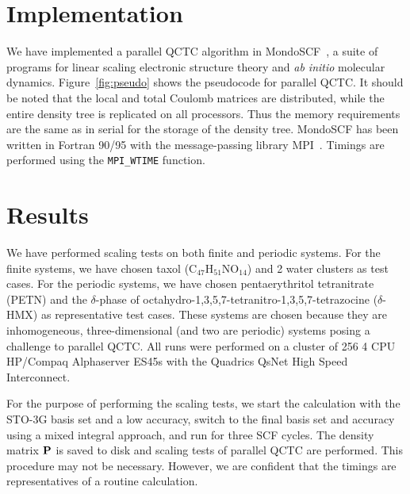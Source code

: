 \commentoutA{\documentclass[prl,aps,twocolumn,twocolumngrid,superbib]{revtex4}}
\begin{document}
\section{Implementation}
\label{sec:implementation}
We have implemented a parallel QCTC algorithm in {\sc
MondoSCF}~\cite{MondoSCF}, a suite of programs for linear scaling
electronic structure theory and {\it ab initio}\/ molecular dynamics.
Figure~\ref{fig:pseudo} shows the pseudocode for parallel QCTC.
It should be noted that the local and total Coulomb matrices are distributed,
while the entire density tree is replicated on all processors.
Thus the memory requirements are the same as in serial for the storage of
the density tree.
{\sc MondoSCF} has been written in Fortran 90/95 with the
message-passing library MPI~\cite{mpi}.  Timings are performed using
the {\tt MPI\_WTIME} function.

\section{Results}
\label{results}
We have performed scaling tests on both finite and periodic
systems. For the finite systems, we have chosen taxol
(C$_{47}$H$_{51}$NO$_{14}$) and 2 water clusters as test cases. For
the periodic systems, we have chosen pentaerythritol tetranitrate
(PETN)\cite{CGan04A} and the $\delta$-phase of
octahydro-1,3,5,7-tetranitro-1,3,5,7-tetrazocine
($\delta$-HMX)\cite{JPLewis00} as representative test cases. These
systems are chosen because they are inhomogeneous,
three-dimensional (and two are periodic) systems posing a challenge to
parallel QCTC. All runs were performed on a cluster of 256 4 CPU
HP/Compaq Alphaserver ES45s with the Quadrics QsNet High Speed
Interconnect.

For the purpose of performing the scaling tests, we start the
calculation with the STO-3G basis set and a low accuracy, switch
to the final basis set and accuracy using a mixed integral approach,
and run for three SCF cycles. The density matrix ${\bf P}$ is saved to
disk and scaling tests of parallel QCTC are performed. This procedure
may not be necessary. However, we are confident that the timings are
representatives of a routine calculation.
\end{document}
